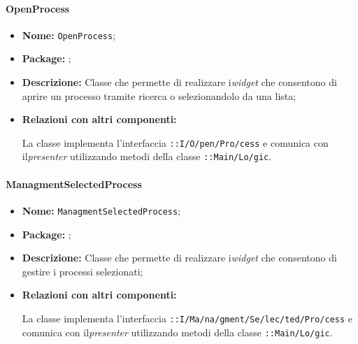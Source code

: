 \paragraph{OpenProcess}
\begin{flushleft}
\begin{itemize}
\item \textbf{Nome:} \texttt{OpenProcess};
\item \textbf{Package:} \texttt{\viewAdmin{}};
\item \textbf{Descrizione:} Classe che permette di realizzare i\textit{widget} che consentono di aprire un processo tramite ricerca o selezionandolo da una lista;
\item \textbf{Relazioni con altri componenti:}
\begin{sloppypar}
La classe implementa l'interfaccia \texttt{\iViewAdmin{}::I\fshyp{}O\fshyp{}pen\fshyp{}Pro\fshyp{}cess} e comunica con il\textit{presenter} utilizzando metodi della classe \texttt{\logicAdmin{}::Main\fshyp{}Lo\fshyp{}gic}.
\end{sloppypar}
\end{itemize}
\end{flushleft}

\paragraph{ManagmentSelectedProcess}
\begin{flushleft}
\begin{itemize}
\item \textbf{Nome:} \texttt{ManagmentSelectedProcess};
\item \textbf{Package:} \texttt{\viewAdmin{}};
\item \textbf{Descrizione:} Classe che permette di realizzare i\textit{widget} che consentono di gestire i processi selezionati;
\item \textbf{Relazioni con altri componenti:}
\begin{sloppypar}
La classe implementa l'interfaccia \texttt{\iViewAdmin{}::I\fshyp{}Ma\fshyp{}na\fshyp{}gment\fshyp{}Se\fshyp{}lec\fshyp{}ted\fshyp{}Pro\fshyp{}cess} e comunica con il\textit{presenter} utilizzando metodi della classe \texttt{\logicAdmin{}::Main\fshyp{}Lo\fshyp{}gic}.
\end{sloppypar}
\end{itemize}
\end{flushleft}

